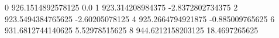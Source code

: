 0 926.1514892578125 0.0
1 923.314208984375 -2.8372802734375
2 923.5494384765625 -2.60205078125
4 925.2664794921875 -0.885009765625
6 931.6812744140625 5.52978515625
8 944.6212158203125 18.4697265625

